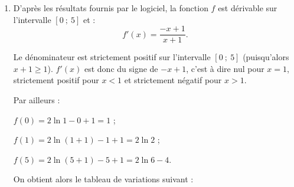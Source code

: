 \begin{corrige}
     \begin{enumerate}
          \item %
          D'après les résultats fournis par le logiciel, la fonction $f$ est dérivable sur l'intervalle $[0~;~5]$ et :
          \[ f'(x)=\dfrac{-x+1}{x+1}. \]
          \par
          Le dénominateur est strictement positif sur l'intervalle $[0~;~5]$ (puisqu'alors $x+1 \geqslant 1$). $f'(x)$ est donc du signe de $-x+1$, c'est à dire nul pour ${x=1}$, strictement positif pour ${x < 1}$ et strictement négatif pour ${x > 1}$.
          \par
          Par ailleurs :
          \par
          $f(0)=2\ln1-0+1=1$ ;
          \par
          $f(1)=2\ln(1+1)-1+1=2\ln2$ ;
          \par
          $f(5)=2\ln(5+1)-5+1=2\ln6 - 4$.
          \par
          On obtient alors le tableau de variations suivant :
          \par
          \begin{center}
               \begin{extern}%
\end{extern}
\end{center}
\end{enumerate}
\end{corrige}
